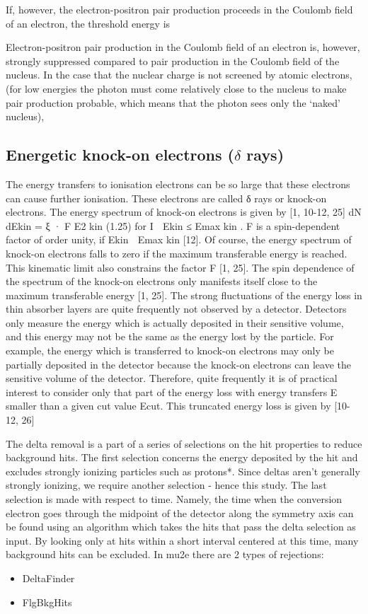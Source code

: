 If, however, the electron-positron pair production proceeds in the
Coulomb field of an electron, the threshold energy is

Electron-positron pair production in the Coulomb field of an electron is,
however, strongly suppressed compared to pair production in the Coulomb
field of the nucleus.
In the case that the nuclear charge is not screened by atomic electrons,
(for low energies the photon must come relatively close to the nucleus to
make pair production probable, which means that the photon sees only
the ‘naked’ nucleus),

\subsection{Energetic knock-on electrons ($\delta$ rays)}
The energy transfers to ionisation electrons can be so large that these
electrons can cause further ionisation. These electrons are called δ rays or
knock-on electrons. The energy spectrum of knock-on electrons is given
by [1, 10-12, 25]
dN
dEkin
= ξ · F
E2
kin
(1.25)
for I  Ekin ≤ Emax
kin .
F is a spin-dependent factor of order unity, if Ekin  Emax
kin [12]. Of
course, the energy spectrum of knock-on electrons falls to zero if the
maximum transferable energy is reached. This kinematic limit also constrains the factor F [1, 25]. The spin dependence of the spectrum of the
knock-on electrons only manifests itself close to the maximum transferable
energy [1, 25].
The strong fluctuations of the energy loss in thin absorber layers are
quite frequently not observed by a detector. Detectors only measure the
energy which is actually deposited in their sensitive volume, and this
energy may not be the same as the energy lost by the particle. For example, the energy which is transferred to knock-on electrons may only be
partially deposited in the detector because the knock-on electrons can
leave the sensitive volume of the detector.
Therefore, quite frequently it is of practical interest to consider only
that part of the energy loss with energy transfers E smaller than a given
cut value Ecut. This truncated energy loss is given by [10-12, 26]










The delta removal is a part of a series of selections on the hit properties to reduce background
hits.
The first selection concerns the energy deposited by the hit and excludes strongly ionizing
particles such as protons*. Since deltas aren't generally strongly ionizing, we require another selection
- hence this study. The last selection is made with respect to time. Namely, the time when the
conversion electron goes through the midpoint of the detector along the symmetry axis can be found
using an algorithm which takes the hits that pass the delta selection as input. By looking only at hits
within a short interval centered at this time, many background hits can be excluded.
In mu2e there are 2 types of rejections:
\begin{itemize}
    \item DeltaFinder
    \item FlgBkgHits
\end{itemize}


